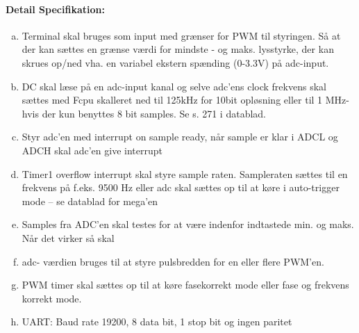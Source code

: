 \documentclass[a4paper,11pt]{article}
\theoremstyle{mytheor}
\begin{document}
\paragraph{Detail Specifikation:}
\begin{enumerate}[(a)]
\item  Terminal skal bruges som input med grænser for PWM til styringen. Så at der kan sættes en grænse værdi for mindste - og maks. lysstyrke, der kan skrues op/ned vha. en variabel ekstern spænding (0-3.3V) på adc-input. 

\item  DC skal læse på en adc-input kanal og selve adc’ens clock frekvens skal sættes med Fcpu skalleret ned til 125kHz for 10bit opløsning eller til 1 MHz- hvis der kun benyttes 8 bit samples. Se s. 271 i datablad. 
\item  Styr adc’en med interrupt on sample ready, når sample er klar i ADCL og ADCH skal adc’en give interrupt 

\item  Timer1 overflow interrupt skal styre sample raten. Sampleraten sættes til en frekvens på f.eks. 9500 Hz eller adc skal sættes op til at køre i auto-trigger mode – se datablad for mega’en

\item  Samples fra ADC’en skal testes for at være indenfor indtastede min. og maks. Når det virker så skal 

\item  adc- værdien bruges til at styre pulsbredden for en eller flere PWM’en. 

\item   PWM timer skal sættes op til at køre fasekorrekt mode eller fase og frekvens korrekt mode. 

\item  UART: Baud rate 19200, 8 data bit, 1 stop bit og ingen paritet 
\end{enumerate}
\end{document}
